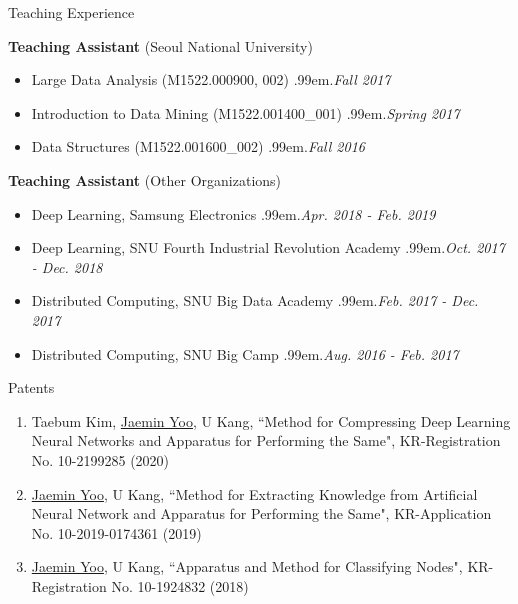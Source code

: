 \documentclass{resume} %
\makeatletter
\newcommand \Dotfill {\leavevmode \cleaders \hb@xt@ .99em{\hss .\hss }\hfill \kern \z@}
\makeatother
\begin{document}
\begin{rSection}{Teaching Experience}

\textbf{Teaching Assistant} (Seoul National University)
\begin{itemize}[noitemsep]
	\item Large Data Analysis (M1522.000900, 002) \smallskip \Dotfill \emph{Fall 2017}
	\item Introduction to Data Mining (M1522.001400\_001) \smallskip \Dotfill \emph{Spring 2017}
	\item Data Structures (M1522.001600\_002) \Dotfill \emph{Fall 2016}
\end{itemize}

\textbf{Teaching Assistant} (Other Organizations)
\begin{itemize}[noitemsep]
	\item Deep Learning, Samsung Electronics \smallskip \Dotfill \emph{Apr. 2018 - Feb. 2019}
	\item Deep Learning, SNU Fourth Industrial Revolution Academy \smallskip \Dotfill \emph{Oct. 2017 - Dec. 2018}
	\item Distributed Computing, SNU Big Data Academy \smallskip \Dotfill \emph{Feb. 2017 - Dec. 2017}
	\item Distributed Computing, SNU Big Camp \smallskip \Dotfill \emph{Aug. 2016 - Feb. 2017}
\end{itemize}

\end{rSection}


\begin{rSection}{Patents}
\smallskip
\begin{enumerate}
		
	\item Taebum Kim, \underline{Jaemin Yoo}, U Kang, ``Method for Compressing Deep Learning Neural Networks and Apparatus for Performing the Same", KR-Registration No. 10-2199285 (2020)

	\item \underline{Jaemin Yoo}, U Kang, ``Method for Extracting Knowledge from Artificial Neural Network and Apparatus for Performing the Same", KR-Application No. 10-2019-0174361 (2019)

	\item \underline{Jaemin Yoo}, U Kang, ``Apparatus and Method for Classifying Nodes", KR-Registration No. 10-1924832 (2018)

\end{enumerate}
\end{rSection}

\end{document}
